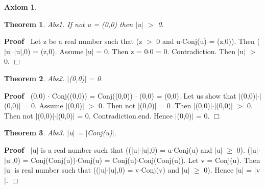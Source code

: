 \documentclass{article}
\newenvironment{forthel}{\begin{leftbar}}{\end{leftbar}}
\newenvironment{proof}{\noindent\textbf{Proof\ }}{\hspace*{\fill}$\Box$\medskip}
\newtheorem{axiom}{Axiom}
\newtheorem{theorem}{Theorem}
\newcommand{\cmul}{\cdot}
\begin{document}
\begin{forthel}
\begin{axiom}
\end{axiom}



\begin{theorem}
 Abs1. If not u = (0,0) then $|$u$|$ $>$ 0.
\end{theorem}\begin{proof}
  Let z be a real number such that (z $>$ 0 and u$\cmul$Conj(u) = (z,0)). Then ($|$u$|$$\cdot$$|$u$|$,0) = (z,0).
Assume $|$u$|$ = 0. Then z = 0$\cdot$0 = 0. Contradiction. 
Then $|$u$|$ $>$ 0.
\end{proof}


\begin{theorem}
 Abs2. $|$(0,0)$|$ = 0.
\end{theorem}\begin{proof}
 	(0,0) $\cmul$ Conj((0,0)) = Conj((0,0)) $\cmul$ (0,0) = (0,0). 
Let us show that $|$(0,0)$|$$\cdot$$|$(0,0)$|$ = 0.
Assume $|$(0,0)$|$ $>$ 0. Then not $|$(0,0)$|$ = 0 .Then $|$(0,0)$|$$\cdot$$|$(0,0)$|$ $>$ 0. Then not $|$(0,0)$|$$\cdot$$|$(0,0)$|$ = 0. Contradiction.end. 
Hence $|$(0,0)$|$ = 0.
\end{proof}


\begin{theorem}
 Abs3. $|$u$|$ = $|$Conj(u)$|$.
\end{theorem}\begin{proof}
 	$|$u$|$ is a real number such that (($|$u$|$$\cdot$$|$u$|$,0) = u$\cmul$Conj(u) and $|$u$|$ $\geq$ 0). 
($|$u$|$$\cdot$$|$u$|$,0) = Conj(Conj(u))$\cmul$Conj(u) = Conj(u)$\cmul$Conj(Conj(u)).
Let v = Conj(u). Then $|$u$|$ is real number such that (($|$u$|$$\cdot$$|$u$|$,0) = v$\cmul$Conj(v) and $|$u$|$ $\geq$ 0). 
Hence $|$u$|$ = $|$v$|$.
\end{proof}



\end{forthel}
\end{document}
